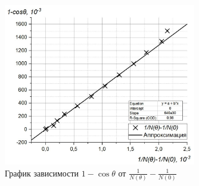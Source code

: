 \documentclass[a4paper, 12pt]{article}%
\begin{document}
\begin{figure}[h]
\begin{center}
\includegraphics[width = 0.75\textwidth]{1.jpg}
\caption{График зависимости $1-\cos \theta$ от $\frac{1}{N(\theta)} - \frac{1}{N(0)}$
}
\end{center}
\end{figure}
\newpage
\end{document}

